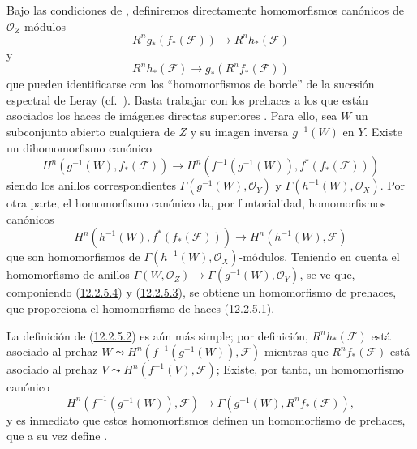 \begin{env}[12.2.5]
\label{0.12.2.5}
\label{0.12.2.5-fr}
Bajo las condiciones de , definiremos directamente
homomorfismos canónicos de $\mathcal O_Z$-módulos
\[
\label{0.12.2.5.1-fr}
\tag{12.2.5.1}
R^n g_*(f_*(\mathcal F))\longrightarrow R^n h_*(\mathcal F)
\]
y
\[
\label{0.12.2.5.2-fr}
\tag{12.2.5.2}
R^n h_*(\mathcal F)\longrightarrow g_*(R^n f_*(\mathcal F))
\]
que pueden identificarse con los ``homomorfismos de borde'' de la sucesión
espectral de Leray (cf.\ ).
Basta trabajar con los prehaces a los que están asociados los haces de
imágenes directas superiores .
Para ello, sea $W$ un subconjunto abierto cualquiera de $Z$ y su imagen inversa $g^{-1}(W)$ en $Y$.  Existe un
dihomomorfismo canónico
\[
\label{0.12.2.5.3-fr}
\tag{12.2.5.3}
H^n(g^{-1}(W),f_*(\mathcal F))\longrightarrow
H^n(f^{-1}(g^{-1}(W)),f^*(f_*(\mathcal F)))
\]
siendo los anillos correspondientes
$\Gamma(g^{-1}(W),\mathcal O_Y)$ y
$\Gamma(h^{-1}(W),\mathcal O_X)$.
Por otra parte, el homomorfismo canónico
 da, por funtorialidad,
homomorfismos canónicos
\[
\label{0.12.2.5.4-fr}
\tag{12.2.5.4}
H^n(h^{-1}(W),f^*(f_*(\mathcal F)))\longrightarrow
H^n(h^{-1}(W),\mathcal F)
\]
que son homomorfismos de
$\Gamma(h^{-1}(W),\mathcal O_X)$-módulos.
Teniendo en cuenta el homomorfismo de anillos
$\Gamma(W,\mathcal O_Z)\to\Gamma(g^{-1}(W),\mathcal O_Y)$, se ve que, componiendo (\hyperref[0.12.2.5.4-fr]{12.2.5.4}) y (\hyperref[0.12.2.5.3-fr]{12.2.5.3}), se obtiene un homomorfismo de prehaces, que proporciona el homomorfismo de haces (\hyperref[0.12.2.5.1-fr]{12.2.5.1}).

La definición de (\hyperref[0.12.2.5.2-fr]{12.2.5.2}) es aún más simple; por definición, $R^n h_*(\mathcal F)$ está asociado al prehaz
$W\leadsto H^n(f^{-1}(g^{-1}(W)),\mathcal F)$
mientras que $R^n f_*(\mathcal F)$ está asociado al prehaz
$V\leadsto H^n(f^{-1}(V),\mathcal F)$;
Existe, por tanto, un homomorfismo canónico
\[
H^n(f^{-1}(g^{-1}(W)),\mathcal F)\longrightarrow
\Gamma(g^{-1}(W),R^n f_*(\mathcal F)),
\]
y es inmediato que estos homomorfismos definen un homomorfismo de
prehaces, que a su vez define .
\end{env}

